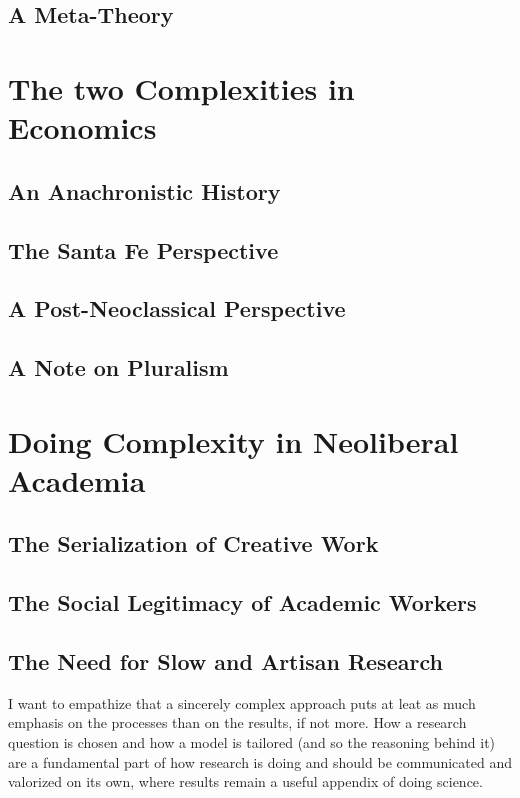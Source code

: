 \documentclass[a4paper, headings=standardclasses]{scrartcl}
\begin{document}
	\subsection{A Meta-Theory}
	
	\section{The two Complexities in Economics}
	\subsection{An Anachronistic History}
	
	\subsection{The Santa Fe Perspective}
	
	\subsection{A Post-Neoclassical Perspective}
	
	\subsection{A Note on Pluralism}
	
	\section{Doing Complexity in Neoliberal Academia}
	\subsection{The Serialization of Creative Work}
	
    \subsection{The Social Legitimacy of Academic Workers}

	\subsection{The Need for Slow and Artisan Research}
	I want to empathize that a sincerely complex approach puts at leat as much emphasis on the processes than on the results, if not more. How a research question is chosen and how a model is tailored (and so the reasoning behind it) are a fundamental part of how research is doing and should be communicated and valorized on its own, where results remain a useful appendix of doing science.

	\printbibliography
	
\end{document}
